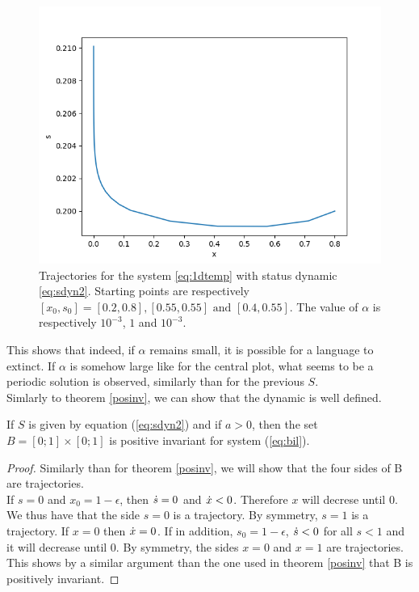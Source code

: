 \documentclass{article}
\begin{document}
\begin{figure}
\includegraphics[scale=0.4]{traj1D208021e-3.png}
\caption{Trajectories for the system \ref{eq:1dtemp} with status dynamic \ref{eq:sdyn2}. Starting points are respectively $[x_0, s_0] = [0.2, 0.8], [0.55,0.55] \text{   and   } [0.4, 0.55]$. The value of $\alpha$ is respectively $10^{-3}$, $1$ and $10^{-3}$.}
\label{fig:traj1D2}
\end{figure}

This shows that indeed, if $\alpha$ remains small, it is possible for a language to extinct.
If $\alpha$ is somehow large like for the central plot, what seems to be a periodic solution is observed, similarly than for the previous $S$.\\
Simlarly to theorem \ref{posinv}, we can show that the dynamic is well defined. \\
\begin{theorem}{}
\label{posinv2}
If $S$ is given by equation (\ref{eq:sdyn2}) and if $a>0$, then the set $B = [0;1] \times [0;1]$ is positive invariant for system (\ref{eq:bil}).
\end{theorem}

\begin{proof}
Similarly than for theorem \ref{posinv}, we will show that the four sides of B are trajectories. \\
If $s = 0$ and $x_0 = 1-\epsilon$, then $\dot{s} = 0$ and $\dot{x} < 0$. Therefore $x$ will decrese until $0$.
We thus have that the side $s=0$ is a trajectory.
By symmetry, $s=1$ is a trajectory.
If $x=0$ then $\dot{x} = 0$. If in addition, $s_0 = 1-\epsilon$, $\dot{s} < 0$ for all $s < 1$ and it will decrease until $0$.
By symmetry, the sides $x=0$ and $x=1$ are trajectories.
This shows by a similar argument than the one used in theorem \ref{posinv} that  B is positively invariant.
\end{proof}
\end{document}
